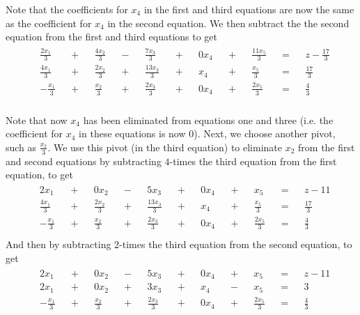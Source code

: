 Note that the coefficients for $x_4$ in the first and third equations are now
the same as the coefficient for $x_4$ in the second equation. We then subtract
the the second equation from the first and third equations to get
\begin{eqnarray}
    \label{example01}
    \begin{aligned}
        && \frac{2x_1}{3} &&+&& \frac{4x_2}{3} &&-&& \frac{7x_3}{3} &&+&& 0x_4
            &&+&& \frac{11x_5}{3} &&=&& z - \frac{17}{3}& \\
        && \frac{4x_1}{3} &&+&& \frac{2x_2}{3} &&+&& \frac{13x_3}{3} &&+&& x_4
            &&+&& \frac{x_5}{3} &&=&& \frac{17}{3}& \\
        && -\frac{x_1}{3} &&+&& \frac{x_2}{3} &&+&& \frac{2x_3}{3} &&+&& 0x_4
            &&+&& \frac{2x_5}{3} &&=&& \frac{4}{3}& \\
    \end{aligned}
\end{eqnarray}

Note that now $x_4$ has been eliminated from equations one and three (i.e. the
coefficient for $x_4$ in these equations is now $0$). Next, we choose another
pivot, such as $\frac{x_2}{3}$. We use this pivot (in the third equation) to
eliminate $x_2$ from the first and second equations by subtracting $4$-times
the third equation from the first equation, to get
\begin{eqnarray}
    \label{example01}
    \begin{aligned}
        && 2x_1 &&+&& 0x_2 &&-&& 5x_3 &&+&& 0x_4 &&+&& x_5 &&=&& z -11& \\
        && \frac{4x_1}{3} &&+&& \frac{2x_2}{3} &&+&& \frac{13x_3}{3} &&+&& x_4
            &&+&& \frac{x_5}{3} &&=&& \frac{17}{3}& \\
        && -\frac{x_1}{3} &&+&& \frac{x_2}{3} &&+&& \frac{2x_3}{3} &&+&& 0x_4
            &&+&& \frac{2x_5}{3} &&=&& \frac{4}{3}& \\
    \end{aligned}
\end{eqnarray}
And then by subtracting $2$-times the third equation from the second equation,
to get 
\begin{eqnarray}
    \label{example01}
    \begin{aligned}
        && 2x_1 &&+&& 0x_2 &&-&& 5x_3 &&+&& 0x_4 &&+&& x_5 &&=&& z -11& \\
        && 2x_1 &&+&& 0x_2 &&+&& 3x_3 &&+&& x_4 &&-&& x_5 &&=&& 3& \\
        && -\frac{x_1}{3} &&+&& \frac{x_2}{3} &&+&& \frac{2x_3}{3} &&+&& 0x_4
            &&+&& \frac{2x_5}{3} &&=&& \frac{4}{3}& \\
    \end{aligned}
\end{eqnarray}

